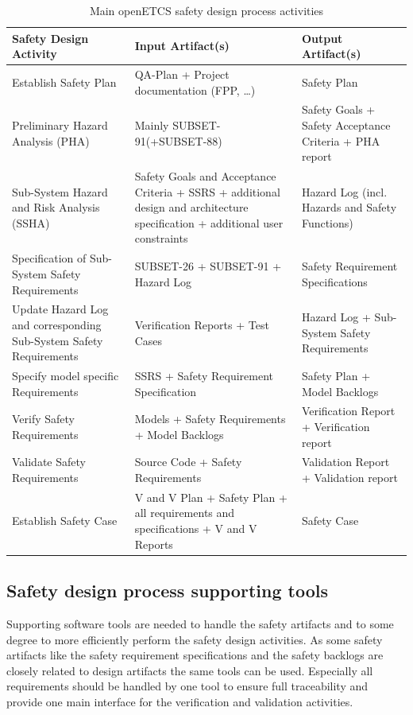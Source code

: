 \documentclass{template/openetcs_article}
\begin{document}
\begin{table}[htbp]
  \centering
  \caption{Main openETCS safety design process activities}
    \begin{tabular}{p{4cm}|p{6cm}|p{4cm}} 
 \textbf{Safety Design Activity} & \textbf{Input Artifact(s)} & \textbf{Output Artifact(s)}  \\ \hline
 Establish Safety Plan & QA-Plan + Project documentation (FPP, …) & Safety Plan \\
 Preliminary Hazard Analysis (PHA) & Mainly SUBSET-91(+SUBSET-88) &  Safety Goals + Safety Acceptance Criteria +  PHA report\\ 
 Sub-System Hazard and Risk Analysis (SSHA) & Safety Goals and Acceptance Criteria + SSRS + additional design and architecture specification + additional user constraints  & Hazard Log (incl. Hazards and Safety Functions) \\ 
  Specification of Sub-System Safety Requirements & SUBSET-26 + SUBSET-91 + Hazard Log  & Safety Requirement Specifications \\ 
 Update Hazard Log and corresponding Sub-System Safety Requirements & Verification Reports + Test Cases & Hazard Log + Sub-System Safety Requirements \\
 Specify model specific Requirements & SSRS + Safety Requirement Specification & Safety Plan + Model Backlogs\\
 Verify Safety Requirements & Models + Safety Requirements + Model Backlogs & Verification Report + Verification report \\
 Validate Safety Requirements & Source Code + Safety Requirements & Validation Report + Validation report \\
 Establish Safety Case & V and V Plan + Safety Plan + all requirements and specifications + V and V Reports & Safety Case \\ 
 
\end{tabular}  
  \label{tab:openETCS-Safety-activities}%
\end{table}%

\subsection{Safety design process supporting tools}

Supporting software tools are needed to handle the safety artifacts and to some degree to more efficiently perform the safety design activities. As some safety artifacts like the safety requirement specifications and the safety backlogs are closely related to design artifacts the same tools can be used. Especially all requirements should be handled by one tool to ensure full traceability and provide one main interface for the verification and validation activities.
\end{document}
